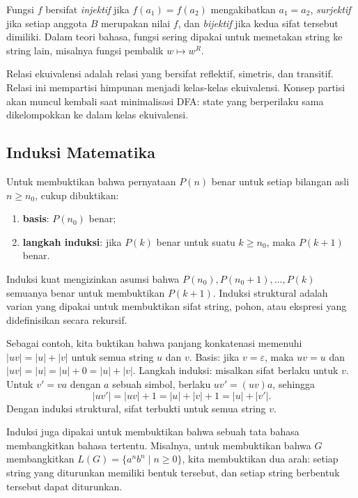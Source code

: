 Fungsi \(f\) bersifat \emph{injektif} jika \(f(a_1) = f(a_2)\)
mengakibatkan \(a_1 = a_2\), \emph{surjektif} jika setiap anggota \(B\)
merupakan nilai \(f\), dan \emph{bijektif} jika kedua sifat tersebut
dimiliki. Dalam teori bahasa, fungsi sering dipakai untuk memetakan
string ke string lain, misalnya fungsi pembalik \(w \mapsto w^R\).

Relasi ekuivalensi adalah relasi yang bersifat reflektif, simetris, dan
transitif. Relasi ini mempartisi himpunan menjadi kelas-kelas
ekuivalensi. Konsep partisi akan muncul kembali saat minimalisasi DFA:
state yang berperilaku sama dikelompokkan ke dalam kelas ekuivalensi.

\subsection{Induksi Matematika}

\begin{definisi}
Untuk membuktikan bahwa pernyataan \(P(n)\) benar untuk setiap bilangan
asli \(n \ge n_0\), cukup dibuktikan:
\begin{enumerate}[label=(\roman*),leftmargin=*]
  \item \textbf{basis}: \(P(n_0)\) benar;
  \item \textbf{langkah induksi}: jika \(P(k)\) benar untuk suatu
        \(k \ge n_0\), maka \(P(k+1)\) benar.
\end{enumerate}
\end{definisi}

Induksi kuat mengizinkan asumsi bahwa \(P(n_0), P(n_0+1), \ldots, P(k)\)
semuanya benar untuk membuktikan \(P(k+1)\). Induksi struktural adalah
varian yang dipakai untuk membuktikan sifat string, pohon, atau
ekspresi yang didefinisikan secara rekursif.

Sebagai contoh, kita buktikan bahwa panjang konkatenasi memenuhi
\(|uv| = |u| + |v|\) untuk semua string \(u\) dan \(v\). Basis:
jika \(v = \varepsilon\), maka \(uv = u\) dan \(|uv| = |u| =
|u| + 0 = |u| + |v|\). Langkah induksi: misalkan sifat berlaku untuk
\(v\). Untuk \(v' = va\) dengan \(a\) sebuah simbol, berlaku
\(uv' = (uv)a\), sehingga
\[
|uv'| = |uv| + 1 = |u| + |v| + 1 = |u| + |v'|.
\]
Dengan induksi struktural, sifat terbukti untuk semua string \(v\).

Induksi juga dipakai untuk membuktikan bahwa sebuah tata bahasa
membangkitkan bahasa tertentu. Misalnya, untuk membuktikan bahwa
\(G\) membangkitkan \(L(G) = \{a^n b^n \mid n \ge 0\}\), kita
membuktikan dua arah: setiap string yang diturunkan memiliki bentuk
tersebut, dan setiap string berbentuk tersebut dapat diturunkan.
